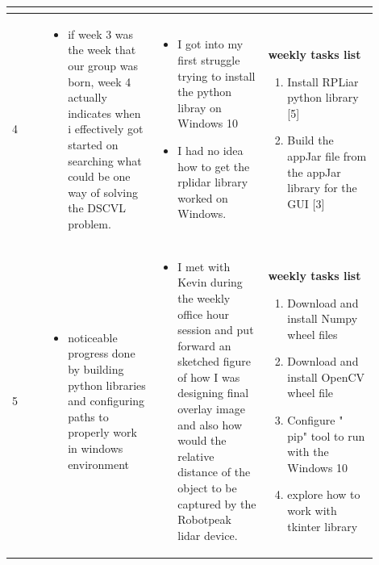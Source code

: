 \documentclass[10pt,draftclsnofoot,onecolumn,journal,compsoc]{IEEEtran}
\begin{document}
\begin{singlespace}
\begin{longtable}{|l|p{0.3\linewidth}|p{0.3\linewidth}|p{0.3\linewidth}|}
\begin{itemize}
\end{itemize}
			\\\hline

		4	&
\begin{itemize}
\item if week 3 was the week that our group was born, week 4 actually indicates when i effectively got started on searching what could be one way of solving the DSCVL problem.
\end{itemize}
			&
\begin{itemize}
\item I got into my first struggle trying to install the python libray on Windows 10
\item I had no idea how to get the rplidar library worked on Windows.  

\end{itemize}
			&
	\textbf{ weekly tasks list}  	
\begin{enumerate}
\item Install RPLiar python library [5]
\item Build the appJar  file from the appJar library for the GUI [3] 
\end{enumerate}
			\\\hline

		5 	&
\begin{itemize}
\item noticeable progress done by building python libraries and configuring paths to properly work in windows environment 
\end{itemize}
			&
\begin{itemize}
\item I met with Kevin during the weekly office hour session and put forward an sketched figure of how I was designing  final overlay image and also how would the relative distance of the object to be captured by the Robotpeak lidar device. 
\end{itemize}
			&
	\textbf{ weekly tasks list}
	\begin{enumerate}
	\item Download and install Numpy  wheel files
	\item Download and install OpenCV wheel file
	\item Configure " pip" tool to run with the Windows 10
	\item explore how to work with tkinter library  
	\end{enumerate}

			\\\hline


\end{longtable}
\end{singlespace}
\end{document}
